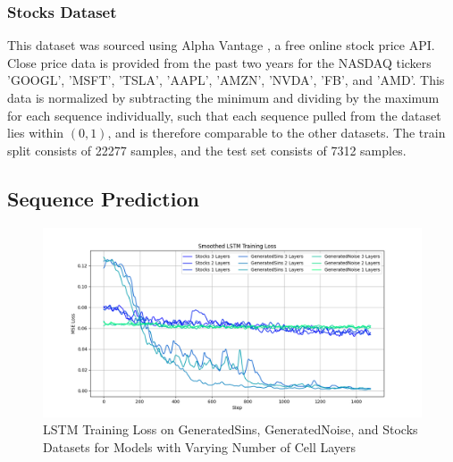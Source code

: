 \documentclass{scrartcl}
\begin{document}
\subsubsection{Stocks Dataset}
\label{subsubsec:stocks_intro}

This dataset was sourced using Alpha Vantage \cite{alpha_vantage}, a free
online stock price API. Close price data is provided from the past two years
for the NASDAQ tickers 'GOOGL', 'MSFT', 'TSLA', 'AAPL', 'AMZN', 'NVDA', 'FB',
and 'AMD'. This data is normalized by subtracting the minimum and dividing by
the maximum for each sequence individually, such that each sequence pulled from
the dataset lies within $(0, 1)$, and is therefore comparable to the other
datasets. The train split consists of 22277 samples, and the test set consists
of 7312 samples.

\subsection{Sequence Prediction}
\label{subsec:experiment_sp}

\begin{figure}[H]
	\begin{center}
		\includegraphics[width=1\textwidth]{plots/lstm_train_loss.png}
	\end{center}
	\caption{LSTM Training Loss on GeneratedSins, GeneratedNoise, and Stocks \\
	Datasets for Models with Varying Number of Cell Layers}
	\label{plt:lstm_train_loss}
\end{figure}
\end{document}
